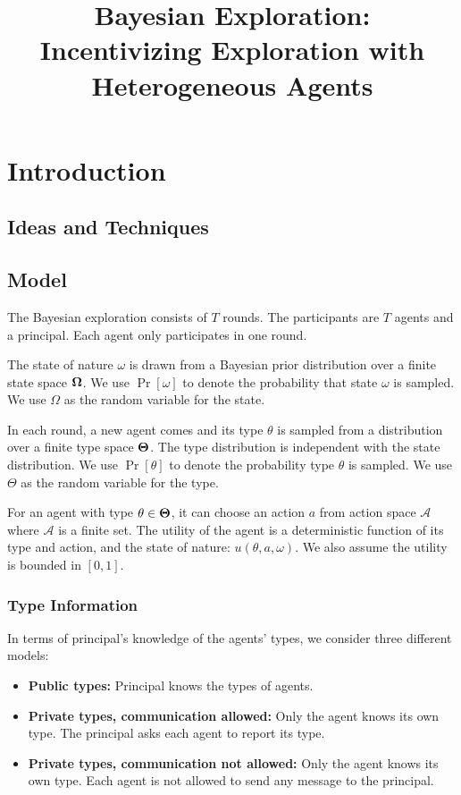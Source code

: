 \documentclass[11pt]{article}
\title{Bayesian Exploration:\\ Incentivizing Exploration with Heterogeneous Agents}
\author{
}
\def\A{\mathcal{A}}
\def\varTheta{\bold{\Theta}}
\def\varOmega{\bold{\Omega}}
\begin{document}
\maketitle

\section{Introduction}

\subsection{Ideas and Techniques}


\subsection{Model}
The Bayesian exploration consists of $T$ rounds. The participants are $T$ agents and a principal. Each agent only participates in one round.

The state of nature $\omega$ is drawn from a Bayesian prior distribution over a finite state space $\varOmega$. We use $\Pr[\omega]$ to denote the probability that state $\omega$ is sampled. We use $\Omega$ as the random variable for the state.

In each round, a new agent comes and its type $\theta$ is sampled from a distribution over a finite type space $\varTheta$. The type distribution is independent with the state distribution. We use $\Pr[\theta]$ to denote the probability type $\theta$ is sampled. We use $\Theta$ as the random variable for the type.

For an agent with type $\theta \in \varTheta$, it can choose an action $a$ from action space $\A$ where $\A$ is a finite set. The utility of the agent is a deterministic function of its type and action, and the state of nature: $u(\theta, a, \omega)$. We also assume the utility is bounded in $[0,1]$.

\subsubsection{Type Information}
In terms of principal's knowledge of the agents' types, we consider three different models:
\begin{itemize}
\item \textbf{Public types:} Principal knows the types of agents.
\item \textbf{Private types, communication allowed:} Only the agent knows its own type. The principal asks each agent to report its type.
\item \textbf{Private types, communication not allowed:}  Only the agent knows its own type. Each agent is not allowed to send any message to the principal.
\end{itemize}













\end{document}
